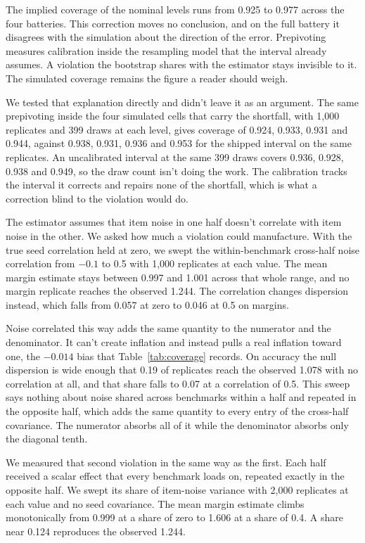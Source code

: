 The implied coverage of the nominal levels runs from 0.925 to 0.977 across the four batteries. This correction moves no conclusion, and on the full battery it disagrees with the simulation about the direction of the error. Prepivoting measures calibration inside the resampling model that the interval already assumes. A violation the bootstrap shares with the estimator stays invisible to it. The simulated coverage remains the figure a reader should weigh.

We tested that explanation directly and didn't leave it as an argument. The same prepivoting inside the four simulated cells that carry the shortfall, with 1,000 replicates and 399 draws at each level, gives coverage of 0.924, 0.933, 0.931 and 0.944, against 0.938, 0.931, 0.936 and 0.953 for the shipped interval on the same replicates. An uncalibrated interval at the same 399 draws covers 0.936, 0.928, 0.938 and 0.949, so the draw count isn't doing the work. The calibration tracks the interval it corrects and repairs none of the shortfall, which is what a correction blind to the violation would do.

The estimator assumes that item noise in one half doesn't correlate with item noise in the other. We asked how much a violation could manufacture. With the true seed correlation held at zero, we swept the within-benchmark cross-half noise correlation from $-0.1$ to 0.5 with 1,000 replicates at each value. The mean margin estimate stays between 0.997 and 1.001 across that whole range, and no margin replicate reaches the observed 1.244. The correlation changes dispersion instead, which falls from 0.057 at zero to 0.046 at 0.5 on margins.

Noise correlated this way adds the same quantity to the numerator and the denominator. It can't create inflation and instead pulls a real inflation toward one, the $-0.014$ bias that Table~\ref{tab:coverage} records. On accuracy the null dispersion is wide enough that 0.19 of replicates reach the observed 1.078 with no correlation at all, and that share falls to 0.07 at a correlation of 0.5. This sweep says nothing about noise shared across benchmarks within a half and repeated in the opposite half, which adds the same quantity to every entry of the cross-half covariance. The numerator absorbs all of it while the denominator absorbs only the diagonal tenth.

We measured that second violation in the same way as the first. Each half received a scalar effect that every benchmark loads on, repeated exactly in the opposite half. We swept its share of item-noise variance with 2,000 replicates at each value and no seed covariance. The mean margin estimate climbs monotonically from 0.999 at a share of zero to 1.606 at a share of 0.4. A share near 0.124 reproduces the observed 1.244.

